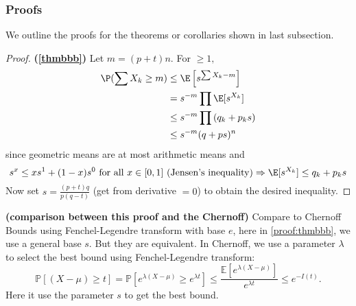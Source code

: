 \documentclass{article}
\newcommand{\bfs}[1]{\textbf{({#1})}}
\begin{document}
\subsubsection{Proofs}\label{ssecproof}
We outline the proofs for the theorems or corollaries shown in last subsection.
\begin{proof}{\bfs{\cref{thmbbb}}}\label{proof:thmbbb}
Let
$m =( p + t ) n$. For $ \geq 1,$
\begin{align*}
\P(\sum X _{ k } \geq m )&\leq \E \left[ s ^{ \sum X_{ k }- m }\right]\\
&= s ^{- m } \prod \E[ s ^{X_{ k }}]\\
&\le s ^{- m } \prod\left( q _{ k }+ p _{ k } s \right) \\
&\leq s ^{- m }( q + ps )^{ n }
\end{align*}
since geometric means are at most arithmetic means and 
$$
s^x \le xs^1 + (1-x) s^0 \text{  for all $x\in[0,1]$ (Jensen's inequality)} \Rightarrow \E[ s ^{X_{ k }}]\le q _{ k }+ p _{ k } s
$$
Now set $s=\frac{(p+t) q}{p(q-t)}$ (get from derivative $=0$) to obtain the desired inequality.
\end{proof}
\begin{rema}{\bfs{comparison between this proof and the Chernoff}}\label{remasvsexp}
Compare to Chernoff Bounds using Fenchel-Legendre transform with  base $e$, here in \cref{proof:thmbbb}, we use a general base $s$. But they are equivalent.
In Chernoff, we use a parameter $\lambda$ to select the best bound using Fenchel-Legendre transform:
$$
\mathbb{P}[(X-\mu) \geq t]=\mathbb{P}\left[e^{\lambda(X-\mu)} \geq e^{\lambda t}\right] \leq \frac{\mathbb{E}\left[e^{\lambda(X-\mu)}\right]}{e^{\lambda t}}\le e^{-I(t)}.
$$
Here it use the parameter $s$ to get the best bound.
\end{rema}
\end{document}
